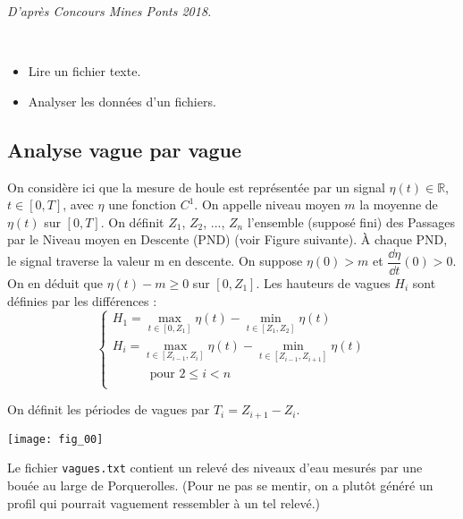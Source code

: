 
%

\setcounter{ques}{0}

\begin{flushright}
\textit{D'après Concours Mines Ponts 2018.}
\end{flushright}
\begin{obj} ~\\
\begin{itemize}
\item Lire un fichier texte.
\item Analyser les données d'un fichiers. 
\end{itemize}
\end{obj}

\subsection*{Analyse vague par vague}

On considère ici que la mesure de houle est représentée par un signal $\eta(t) \in \mathbb{R}$, $t\in[0,T]$, avec
$\eta$ une fonction $C^1$.
On appelle niveau moyen $m$ la moyenne de $\eta(t)$ sur $[0, T]$.
On définit $Z_1$, $Z_2$, ..., $Z_n$ l’ensemble (supposé fini) des Passages par le Niveau moyen en Descente
(PND) (voir Figure suivante). À chaque PND, le signal traverse la valeur m en descente.
On suppose $\eta(0)>m$ et $\dfrac{\dd \eta }{\dd t}(0)>0$. On en déduit que $\eta(t)-m\geq 0$ sur $\left[0, Z_1\right]$.
Les hauteurs de vagues $H_i$ sont définies par les différences :
$$
 \left\{ 
\begin{array}{l}
H_1 = \max_{t\in[0,Z_1]} \eta(t)-\min_{t\in[Z_1,Z_2]} \eta(t) \\
H_i = \max_{t\in[Z_{i-1},Z_i]} \eta(t)-\min_{t\in[Z_{i-1},Z_{i+1}]} \eta(t) \\
\quad \quad \quad \text{pour }2\leq i <  n\\
\end{array}
\right.
$$

On définit les périodes de vagues par $T_i = Z_{i+1}-Z_i$.

\begin{center}
\texttt{[image: fig\_00]}
\end{center}

Le fichier \texttt{vagues.txt} contient un relevé des niveaux d'eau mesurés par une bouée au large de Porquerolles. (Pour ne pas se mentir, on a plutôt généré un profil qui pourrait vaguement ressembler à un tel relevé.)

